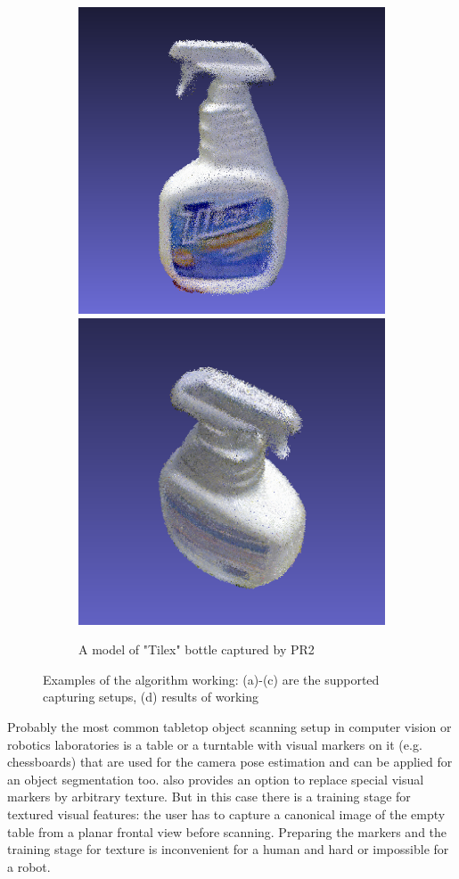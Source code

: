 \documentclass[letterpaper, 10 pt, conference]{ieeeconf}  %
\begin{document}
\begin{figure}[t]
        \begin{subfigure}[b]{\linewidth}
                \centering
                \includegraphics[width=0.49\linewidth]{../tizer/tilexFrontal.png}
                \includegraphics[width=0.49\linewidth]{../tizer/tilexTop.png}
                \caption{A model of "Tilex" bottle captured by PR2}
        \end{subfigure}
        \caption{Examples of the algorithm working: (a)-(c) are the supported 
        capturing setups, (d) results of working}
        \label{fig:tizer}
\end{figure}


Probably the most common tabletop object scanning setup in computer 
vision or robotics laboratories is a table or a turntable with
visual markers on it (e.g. chessboards) that
are used for the camera pose estimation and can be applied for 
an object segmentation too. \cite{ectoObjectRecognitionCapture} also 
provides an option to replace special visual markers by arbitrary texture. 
But in this case there is a training stage for textured visual features:
the user has to capture a canonical image of the empty table from
a planar frontal view before scanning. Preparing the markers
and the training stage for texture is inconvenient for a human and
hard or impossible for a robot. 
\end{document}
